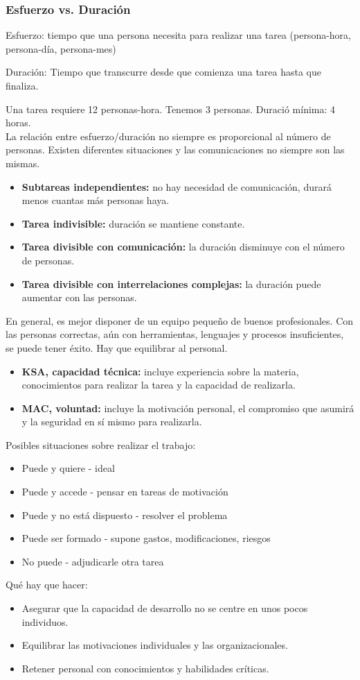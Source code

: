 \documentclass{article}
\begin{document}
\subsubsection{Esfuerzo vs. Duración}
\begin{theorem}
Esfuerzo: tiempo que una persona necesita para realizar una tarea (persona-hora, persona-día, persona-mes)
\end{theorem}
\begin{theorem}
Duración: Tiempo que transcurre desde que comienza una tarea hasta que finaliza. 
\end{theorem}
Una tarea requiere 12 personas-hora. Tenemos 3 personas. Duració mínima: 4 horas.\\
La relación entre esfuerzo/duración no siempre es proporcional al número de personas. Existen diferentes situaciones y las comunicaciones no siempre son las mismas. 
\begin{itemize}
	\item \textbf{Subtareas independientes:} no hay necesidad de comunicación, durará menos cuantas más personas haya.
	\item \textbf{Tarea indivisible: } duración se mantiene constante.
	\item \textbf{Tarea divisible con comunicación: } la duración disminuye con el número de personas.
	\item \textbf{Tarea divisible con interrelaciones complejas: }la duración puede aumentar con las personas.
\end{itemize}
En general, es mejor disponer de un equipo pequeño de buenos profesionales. Con las personas correctas, aún con herramientas, lenguajes y procesos insuficientes, se puede tener éxito. Hay que equilibrar al personal. 
\begin{itemize}
	\item \textbf{KSA, capacidad técnica: } incluye experiencia sobre la materia, conocimientos para realizar la tarea y la capacidad de realizarla. 
	\item \textbf{MAC, voluntad: }incluye la motivación personal, el compromiso que asumirá y la seguridad en sí mismo para realizarla. 
\end{itemize}
Posibles situaciones sobre realizar el trabajo: 
\begin{itemize}
	\item Puede y quiere - ideal
	\item Puede y accede - pensar en tareas de motivación
	\item Puede y no está dispuesto - resolver el problema
	\item Puede ser formado - supone gastos, modificaciones, riesgos
	\item No puede - adjudicarle otra tarea
\end{itemize}
Qué hay que hacer:
\begin{itemize}
	\item Asegurar que la capacidad de desarrollo no se centre en unos pocos individuos. 
	\item Equilibrar las motivaciones individuales y las organizacionales.
	\item Retener personal con conocimientos y habilidades críticas. 
\end{itemize}
\end{document}
